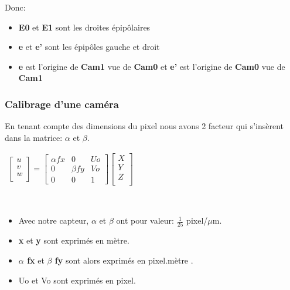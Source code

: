 \documentclass[12pt, french]{report}
\begin{document}
Donc: \\
\begin{itemize}
    \item \textbf{E0} et \textbf{E1} sont les droites épipôlaires
    \item \textbf{e} et \textbf{e'} sont les épipôles gauche et droit
    \item \textbf{e} est l'origine de \textbf{Cam1} vue de \textbf{Cam0} et \textbf{e'} est l'origine de \textbf{Cam0} vue de \textbf{Cam1}\\
\end{itemize} 


\subsubsection{Calibrage d'une caméra}

En tenant compte des dimensions du pixel nous avons 2 facteur qui s'insèrent dans la matrice: \textbf{$\alpha$} et \textbf{$\beta$}.\\

\begin{center}
    $\begin{matrix}
        \begin{bmatrix}
            u\\v\\w\\
        \end{bmatrix}
        =
        \begin{bmatrix}
            \alpha fx &0 &Uo\\
            0&\beta fy&Vo\\
            0&0&1
        \end{bmatrix}
        \begin{bmatrix}
            X\\Y\\Z\\
        \end{bmatrix}
    \end{matrix}$
\end{center}\\
\begin{itemize}
    \item Avec notre capteur, \textbf{$\alpha$} et \textbf{$\beta$} ont pour valeur:  $\frac{1}{25}$ pixel/$\mu$m.
    \item \textbf{x} et \textbf{y} sont exprimés en mètre.
    \item \textbf{$\alpha$ fx} et \textbf{$\beta$ fy} sont alors exprimés en pixel.mètre . 
    \item Uo et Vo  sont exprimés en pixel. \\
\end{itemize}
\end{document}
